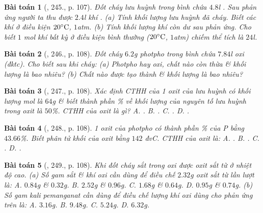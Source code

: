 \documentclass{article}
\newtheorem{baitoan}{Bài toán}
\begin{document}
\begin{baitoan}[\cite{An_400_BT_Hoa_Hoc_8_2020}, 245., p. 107]
	Đốt cháy lưu huỳnh trong bình chứa $4.8$\emph{l }. Sau phản ứng người ta thu được $2.4$\emph{l} khí \emph{}. (a) Tính khối lượng lưu huỳnh đã cháy. Biết các khí ở điều kiện $20^\circ{\rm C}$, $1$\emph{atm}. (b) Tính khối lượng khí \emph{} còn dư sau phản ứng. Cho biết $1$ \emph{mol} khí bất kỳ ở điều kiện bình thường ($20^\circ{\rm C}$, $1$\emph{atm}) chiếm thể tích là $24$\emph{l}.
\end{baitoan}

\begin{baitoan}[\cite{An_400_BT_Hoa_Hoc_8_2020}, 246., p. 108]
	Đốt cháy $6.2$\emph{g} photpho trong bình chứa $7.84$\emph{l} oxi (đktc). Cho biết sau khi cháy: (a) Photpho hay oxi, chất nào còn thừa \& khối lượng là bao nhiêu? (b) Chất nào được tạo thành \& khối lượng là bao nhiêu?
\end{baitoan}

\begin{baitoan}[\cite{An_400_BT_Hoa_Hoc_8_2020}, 247., p. 108]
	Xác định CTHH của 1 oxit của lưu huỳnh có khối lượng mol là $64$\emph{g} \& biết thành phần \% về khối lượng của nguyên tố lưu huỳnh trong oxit là $50$\%. CTHH của oxit là gì? {\sf A.} \emph{}. {\sf B.} \emph{}. {\sf C.} \emph{}. {\sf D.} \emph{}.
\end{baitoan}

\begin{baitoan}[\cite{An_400_BT_Hoa_Hoc_8_2020}, 248., p. 108]
	1 oxit của photpho có thành phần \% của \emph{P} bằng $43.66$\%. Biết phân tử khối của oxit bằng $142$ \emph{đvC}. CTHH của oxit là: {\sf A.} \emph{}. {\sf B.} \emph{}. {\sf C.} \emph{}. {\sf D.} \emph{}.
\end{baitoan}

\begin{baitoan}[\cite{An_400_BT_Hoa_Hoc_8_2020}, 249., p. 108]
	Khi đốt cháy sắt trong oxi được oxit sắt từ \emph{} ở nhiệt độ cao. (a) Số gam sắt \& khí oxi cần dùng để điều chế $2.32$\emph{g} oxit sắt từ lần lượt là: {\sf A.} $0.84$\emph{g} \& $0.32$\emph{g}. {\sf B.} $2.52$\emph{g} \& $0.96$\emph{g}. {\sf C.} $1.68$\emph{g} \& $0.64$\emph{g}. {\sf D.} $0.95$\emph{g} \& $0.74$\emph{g}. (b) Số gam kali pemanganat \emph{} cần dùng để điều chế lượng khí oxi dùng cho phản ứng trên là: {\sf A.} $3.16$\emph{g}. {\sf B.} $9.48$\emph{g}. {\sf C.} $5.24$\emph{g}. {\sf D.} $6.32$\emph{g}.
\end{baitoan}
\end{document}
